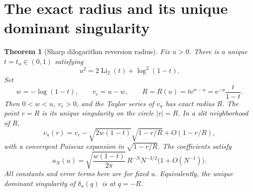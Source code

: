\documentclass[11pt,a4paper]{article}
\newtheorem{theorem}{Theorem}[section]
\theoremstyle{definition}\newtheorem{definition}[theorem]{Definition}
\theoremstyle{remark}\newtheorem{remark}[theorem]{Remark}
\newcommand{\Li}{\operatorname{Li}}
\newcommand{\ee}{\mathrm e}
\numberwithin{equation}{section}
\begin{document}
\section{The exact radius and its unique dominant singularity}\label{sec:radius}

\begin{theorem}[Sharp dilogarithm reversion radius]\label{thm:radius}
Fix $u>0$. There is a unique $t=t_u\in(0,1)$ satisfying
\begin{equation}\label{eq:characteristic-t}
 u^2=2\Li_2(t)+\log^2(1-t).
\end{equation}
Set
\begin{equation}\label{eq:radius-parameters}
 w=-\log(1-t),\qquad v_c=u-w,\qquad
 R=R(u)=t\ee^{w-u}=\ee^{-u}\frac{t}{1-t}.
\end{equation}
Then $0<w<u$, $v_c>0$, and the Taylor series of $v_u$ has exact radius
$R$. The point $r=R$ is its unique singularity on the circle $|r|=R$.
In a slit neighborhood of $R$,
\begin{equation}\label{eq:sqrt-expansion}
 v_u(r)=v_c-\sqrt{2w(1-t)}\sqrt{1-r/R}+O(1-r/R),
\end{equation}
with a convergent Puiseux expansion in $\sqrt{1-r/R}$.
The coefficients satisfy
\begin{equation}\label{eq:large-sector}
 a_N(u)=\sqrt{\frac{w(1-t)}{2\pi}}\,
           R^{-N}N^{-3/2}\bigl(1+O(N^{-1})\bigr).
\end{equation}
All constants and error terms here are for fixed $u$. Equivalently, the
unique dominant singularity of $\delta_u(q)$ is at $q=-R$.
\end{theorem}
\end{document}
